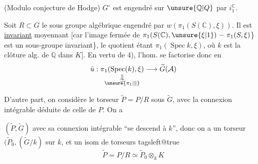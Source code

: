  (Modulo conjecture de Hodge) $G^{\circ}$ est engendré sur $\unsure{\mathbb Q|Q}$ par $i_1^{\mathbb C}$.


Soit $R\subset G$ le sous groupe algébrique engendré par $w(\pi_1(S(\mathbb C),\xi))$. Il est \uline{invariant} moyennant  [car l'image fermée de $\pi_1(S(\mathbb C),\unsure{\xi|1})\relbar\pi_1(S,\xi)$\} est un sous-groupe invariant\}, le quotient étant $\pi_1(\operatorname{Spec} k,\xi)$, où $k$ est la clôture alg. de $\mathbb Q$ dans $K$].  En vertu de 4), l'hom.
se factorise donc en
\[
\tilde u:\underset{\substack{\Vert\\[-.4ex]\simeq\\[-.4ex]\unsure{\pi_1|\Vert}}}{\pi_1(\operatorname{Spec}(k),\xi)}
\longrightarrow\widetilde G(\mathcal A)
\]

D'autre part, on considère le torseur $\widetilde P=P/R$ sous $\widetilde G$, avec la connexion intégrable déduite de celle de $P$. On a

  $(\widetilde P,\widetilde G)$ avec sa connexion intégrable ``se descend à $k$'', donc on a un torseur $(\widetilde P_0,(\widetilde G/k)$ sur $k$, et un isom de torseurs
\begingroup
\csname tagsleft@true\endcsname
\[
\widetilde P=P/R\simeq\widetilde P_0\otimes_k K \tag*{(*)}
\]
\endgroup

